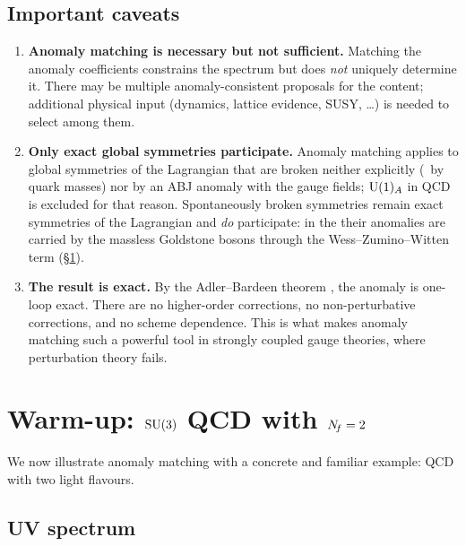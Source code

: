 \documentclass[11pt,a4paper]{article}
\begin{document}
\subsection{Important caveats}

\begin{enumerate}[label=(\alph*)]
  \item \textbf{Anomaly matching is necessary but not sufficient.}
    Matching the anomaly coefficients constrains the \IR{} spectrum but does
    \emph{not} uniquely determine it.  There may be multiple
    anomaly-consistent proposals for the \IR{} content; additional physical
    input (dynamics, lattice evidence, SUSY, \ldots) is needed to select
    among them.

  \item \textbf{Only exact global symmetries participate.}
    Anomaly matching applies to global symmetries of the Lagrangian that
    are broken neither explicitly (\eg\ by quark masses) nor by an ABJ
    anomaly with the gauge fields; $\mathrm{U}(1)_A$ in QCD is excluded for that
    reason.  Spontaneously broken symmetries remain exact symmetries of the
    Lagrangian and \emph{do} participate: in the \IR{} their anomalies are
    carried by the massless Goldstone bosons through the Wess--Zumino--Witten
    term (\S\ref{sec:warmup}).

  \item \textbf{The result is exact.}
    By the Adler--Bardeen theorem \cite{AdlerBardeen1969}, the anomaly
    is one-loop exact.  There are no higher-order corrections, no
    non-perturbative corrections, and no scheme dependence.  This is
    what makes anomaly matching such a powerful tool in strongly coupled
    gauge theories, where perturbation theory fails.
\end{enumerate}


\section{Warm-up: \texorpdfstring{$\mathrm{SU}(3)$}{SU(3)} QCD with \texorpdfstring{$N_{\!f} = 2$}{Nf=2}}
\label{sec:warmup}

We now illustrate anomaly matching with a concrete and familiar example:
QCD with two light flavours.

\subsection{UV spectrum}
\end{document}
